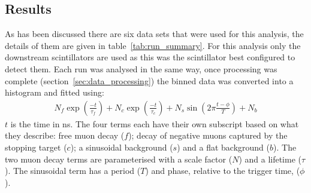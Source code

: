 
\subsection{Results} %
\label{sec:results}
As has been discussed there are six data sets that were used for this analysis, the details of them are given in table~\ref{tab:run_summary}. For this analysis only the downstream scintillators are used as this was the scintillator best configured to detect them. Each run was analysed in the same way, once processing was complete (section~\ref{sec:data_processing}) the binned data was converted into a histogram and fitted using:
\begin{align}
  N_{f}\exp(\frac{-t}{\tau_{f}}) + N_{c}\exp(\frac{-t}{\tau_{c}}) + N_{s}\sin(2\pi\frac{t-\phi}{T}) + N_{b} \label{equ:fit}
\end{align}
\(t\) is the time in ns. The four terms each have their own subscript based on what they describe: free muon decay (\(f\)); decay of negative muons captured by the stopping target (\(c\)); a sinusoidal background (\(s\)) and a flat background (\(b\)). The two muon decay terms are parameterised with a scale factor (\(N\)) and a lifetime (\(\tau\)). The sinusoidal term has a period (\(T\)) and phase, relative to the trigger time, (\(\phi\)). 

